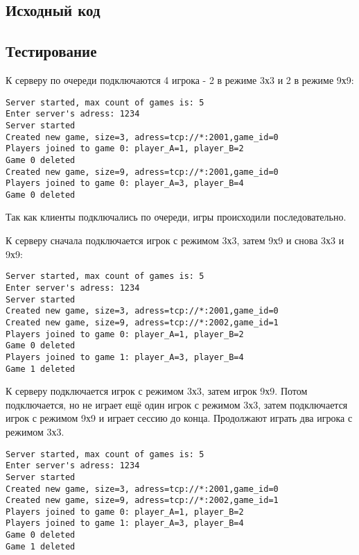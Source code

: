 \documentclass[12pt]{article}
\begin{document}
\subsection*{Исходный код}

{\footnotesize

	

}

\subsection*{Тестирование}

К серверу по очереди подключаются 4 игрока - 2 в режиме 3х3 и 2 в режиме 9х9:
{\footnotesize \begin{lstlisting}
Server started, max count of games is: 5
Enter server's adress: 1234
Server started
Created new game, size=3, adress=tcp://*:2001,game_id=0
Players joined to game 0: player_A=1, player_B=2
Game 0 deleted
Created new game, size=9, adress=tcp://*:2001,game_id=0
Players joined to game 0: player_A=3, player_B=4
Game 0 deleted
\end{lstlisting}}
Так как клиенты подключались по очереди, игры происходили последовательно. 
\newline

\noindent К серверу сначала подключается игрок с режимом 3х3, затем 9х9  и снова 3х3 и 9х9:
{\footnotesize \begin{lstlisting}
Server started, max count of games is: 5
Enter server's adress: 1234
Server started
Created new game, size=3, adress=tcp://*:2001,game_id=0
Created new game, size=9, adress=tcp://*:2002,game_id=1
Players joined to game 0: player_A=1, player_B=2
Game 0 deleted
Players joined to game 1: player_A=3, player_B=4
Game 1 deleted
\end{lstlisting}}

\noindent К серверу подключается игрок с режимом 3х3, затем игрок 9х9. Потом подключается, но не играет ещё один игрок с режимом 3х3, затем подключается игрок с режимом 9х9 и играет сессию до конца. Продолжают играть два игрока с режимом 3х3.

{\footnotesize \begin{lstlisting}
Server started, max count of games is: 5
Enter server's adress: 1234
Server started
Created new game, size=3, adress=tcp://*:2001,game_id=0
Created new game, size=9, adress=tcp://*:2002,game_id=1
Players joined to game 0: player_A=1, player_B=2
Players joined to game 1: player_A=3, player_B=4
Game 0 deleted
Game 1 deleted
\end{lstlisting}}
\end{document}
